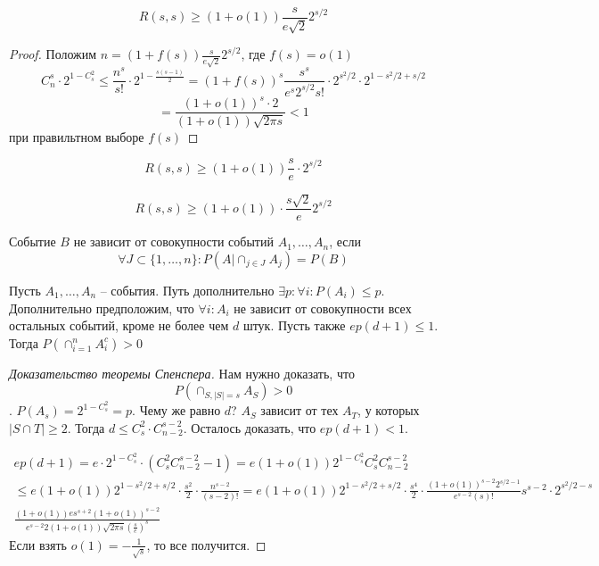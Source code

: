 \documentclass[document.tex]{subfiles}
\begin{document}
\begin{corollary}
	$$R(s, s) \geq (1+o(1))\frac{s}{e\sqrt{2}} 2^{s/2}$$
\end{corollary}
\begin{proof}
	Положим $n = (1+f(s)) \frac{s}{e\sqrt{2}}2^{s/2}$, где $f(s) = o(1)$
	$$C_n^s \cdot 2^{1 - C_s^2} \leq \frac{n^s}{s!} \cdot 2^{1 - \frac{s(s-1)}{2}} = (1+f(s))^s \frac{s^s}{e^s 2^{s/2}s!} \cdot 2^{s^2/2} \cdot 2^{1 - s^2/2 + s/2}$$
	$$= \frac{(1 + o(1))^s \cdot 2}{(1+o(1)) \sqrt{2 \pi s}} < 1$$
	при правильтном выборе $f(s)$

\end{proof}

\begin{theorem}[Эрдеша]
	$$R(s, s) \geq (1+o(1)) \frac{s}{e} \cdot 2^{s/2}$$	
\end{theorem}

\begin{theorem}[Спенсера]
	$$R(s, s) \geq (1+o(1)) \cdot \frac{s\sqrt{2}}{e} 2^{s/2}$$
	
\end{theorem}

\begin{definition}
	Событие $B$ не зависит от совокупности событий $A_1, \ldots, A_n$, если $$\forall J \subset \{1, \ldots, n\}: P(A | \cap_{j \in J} A_j) = P(B)$$
\end{definition}

\begin{lemma}
	Пусть $A_1, \ldots, A_n$ -- события. Путь дополнительно $\exists p : \forall i : P(A_i) \leq p$. Дополнительно предположим, что $\forall i : A_i$ не зависит от совокупности всех остальных событий, кроме не более чем $d$ штук. Пусть также $ep(d+1) \leq 1$. Тогда $P(\cap_{i=1}^nA_i^c) > 0$
\end{lemma}

\begin{proof}[Доказательство теоремы Спенспера]
	Нам нужно доказать, что $$P(\cap_{S, |S| = s} A_S) > 0$$. $P(A_s) = 2^{1 - C_s^2} = p$. Чему же равно $d$? $A_S$ зависит от тех $A_T$, у которых $|S \cap T| \geq 2$. Тогда $d \leq C_s^2 \cdot C_{n-2}^{s-2}$. Осталось доказать, что $ep(d+1) < 1$.

	\begin{multline*}
		ep(d+1) = e \cdot 2^{1 - C_s^2} \cdot (C_s^2 C_{n-2}^{s-2} - 1) = e(1+o(1))2^{1 - C_s^2}C_s^2C_{n-2}^{s-2} \\
		\leq e (1+o(1)) 2^{1 - s^2/2 + s/2} \cdot \frac{s^2}{2} \cdot \frac{n^{s-2}}{(s-2)!} = e (1+o(1)) 2^{1 - s^2/2 + s/2} \cdot \frac{s^4}{2} \cdot \frac{(1+o(1))^{s-2} 2^{s/2 - 1} }{e^{s-2}(s)!}s^{s-2}\cdot 2^{s^2/2-s} \\ 
		\frac{(1+o(1))es^{s+2}(1+o(1))^{s-2}}{e^{s-2}2(1+o(1))\sqrt{2 \pi s} \left(\frac{s}{e}\right)^{s}}	
	\end{multline*}
Если взять $o(1) = -\frac{1}{\sqrt{s}}$, то все получится.
\end{proof}
\end{document}
